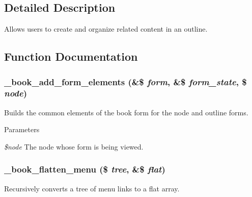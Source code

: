 \subsection{Detailed Description}
Allows users to create and organize related content in an outline. 

\subsection{Function Documentation}
\hypertarget{book_8module_a9469cb06c59dab8b1238d5fedeadf27d}{
\subsubsection[{\_\-book\_\-add\_\-form\_\-elements}]{\setlength{\rightskip}{0pt plus 5cm}\_\-book\_\-add\_\-form\_\-elements (\&\$ {\em form}, \/  \&\$ {\em form\_\-state}, \/  \$ {\em node})}}
\label{book_8module_a9469cb06c59dab8b1238d5fedeadf27d}
Builds the common elements of the book form for the node and outline forms.


\begin{DoxyParams}{Parameters}
\item[{\em \$node}]The node whose form is being viewed. \end{DoxyParams}
\hypertarget{book_8module_ac4d0c3cd6d87770f50a6ba3b29292a7e}{
\subsubsection[{\_\-book\_\-flatten\_\-menu}]{\setlength{\rightskip}{0pt plus 5cm}\_\-book\_\-flatten\_\-menu (\$ {\em tree}, \/  \&\$ {\em flat})}}
\label{book_8module_ac4d0c3cd6d87770f50a6ba3b29292a7e}
Recursively converts a tree of menu links to a flat array.


